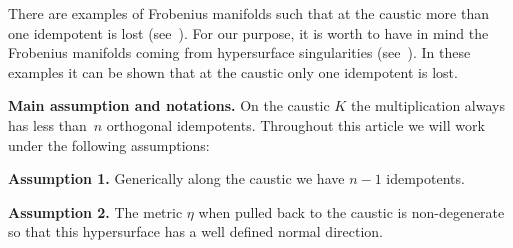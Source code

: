 \documentclass[pdftex]{sigma}
\numberwithin{equation}{section}
\begin{document}
There are examples of Frobenius manifolds such that at the caustic more than one idempotent is lost (see~\cite{Basalaev_2014}). For our purpose, it is worth to have in mind the Frobenius manifolds coming from hypersurface singularities (see~\cite{1573950398998843136, Saito2008FROMPF}). In these examples it can be shown that at the caustic only one idempotent is lost.

\textbf{Main assumption and notations.} On the caustic $K$ the multiplication always has less than~$n$ orthogonal idempotents. Throughout this article we will work under the following assumptions:

\textbf{Assumption 1.} Generically along the caustic we have $n-1$ idempotents.

\textbf{Assumption 2.} The metric $\eta$ when pulled back to the caustic is non-degenerate so that this hypersurface has a well defined normal direction.
\end{document}
